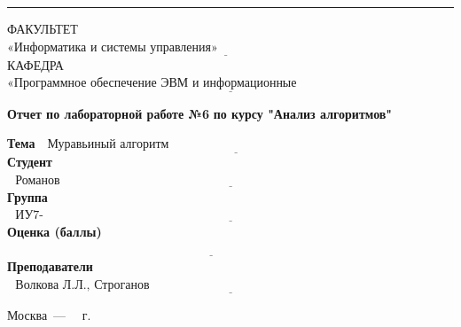 \documentclass[a4paper,14pt]{extreport}
\begin{document}
\begin{titlepage}
        \noindent\rule{18cm}{3pt}
        \newline\newline
        \noindent ФАКУЛЬТЕТ $\underline{\text{«Информатика и системы управления»~~~~~~~~~~~~~~~~~~~~~~~~~~~~~~~~~~~~~~~~~~~~~~~~~~~~~~~}}$ \newline\newline
        \noindent КАФЕДРА $\underline{\text{«Программное обеспечение ЭВМ и информационные технологии»~~~~~~~~~~~~~~~~~~~~~~~}}$\newline\newline\newline\newline\newline\newline\newline


        \begin{center}
            \Large\textbf{Отчет по лабораторной работе №6}
            \Large\textbf{по курсу "Анализ алгоритмов"}
        \end{center}

        \noindent\textbf{Тема} $\underline{\text{~~Муравьиный алгоритм~~~~~~~~~~~~~~~~~~~~~~~~~~~~~~~~~~~~~~~~~~~~~~~~~~~~~~~~~~~~~~~~}}$\newline\newline\newline
        \noindent\textbf{Студент} $\underline{\text{~~Романов С.К.~~~~~~~~~~~~~~~~~~~~~~~~~~~~~~~~~~~~~~~~~~~~~~~~~~~~~~~~~~~~~~~~~~~~~~~~~~~~~~~~~~~~~~~~~}}$\newline\newline
        \noindent\textbf{Группа} $\underline{\text{~~ИУ7-55Б~~~~~~~~~~~~~~~~~~~~~~~~~~~~~~~~~~~~~~~~~~~~~~~~~~~~~~~~~~~~~~~~~~~~~~~~~~~~~~~~~~~~~~~~~~~~~~~~~}}$\newline\newline
        \noindent\textbf{Оценка (баллы)} $\underline{\text{~~~~~~~~~~~~~~~~~~~~~~~~~~~~~~~~~~~~~~~~~~~~~~~~~~~~~~~~~~~~~~~~~~~~~~~~~~~~~~~~~~~~~~~~~~~~~~~~~~~}}$\newline\newline
        \noindent\textbf{Преподаватели} $\underline{\text{~~Волкова Л.Л., Строганов Ю.В.~~~~~~~~~~~~~~~~~~~~~~~~~~~~~~~~~~~~~~~~~~~~~~~~~~~~~~~~~~~~~~~~~~~~~~~~~~~~~~}}$\newline

        \begin{center}
            \vfill
            Москва~---~\the\year
            ~г.
        \end{center}
        \restoregeometry
    \end{titlepage}

\tableofcontents









%

  
\end{document}
